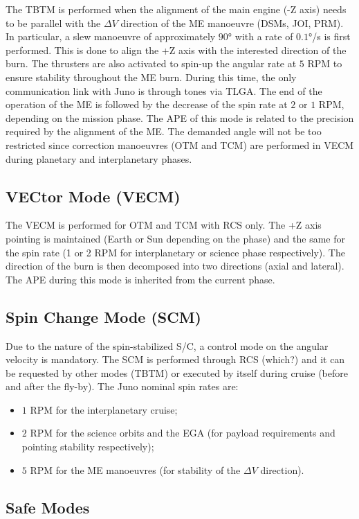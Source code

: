 The TBTM is performed when the alignment of the main engine (-Z axis) needs to be parallel with the $\Delta V$ direction of the ME manoeuvre (DSMs, JOI, PRM). In particular, a slew manoeuvre of approximately $90$° with a rate of $0.1$°/s is first performed. This is done to align the +Z axis with the interested direction of the burn. The thrusters are also activated to spin-up the angular rate at $5$ RPM to ensure stability throughout the ME burn. During this time, the only communication link with Juno is through tones via TLGA. The end of the operation of the ME is followed by the decrease of the spin rate at $2$ or $1$ RPM, depending on the mission phase. The APE of this mode is related to the precision required by the alignment of the ME. The demanded angle will not be too restricted since correction manoeuvres (OTM and TCM) are performed in VECM during planetary and interplanetary phases.

\subsection{VECtor Mode (VECM)}
\label{subsec:vec_mode}

The VECM is performed for OTM and TCM with RCS only. The +Z axis pointing is maintained (Earth or Sun depending on the phase) and the same for the spin rate (1 or 2 RPM for interplanetary or science phase respectively). The direction of the burn is then decomposed into two directions (axial and lateral). The APE during this mode is inherited from the current phase. 

\subsection{Spin Change Mode (SCM)}
\label{subsec:spin_change_mode}

Due to the nature of the spin-stabilized S/C, a control mode on the angular velocity is mandatory. The SCM is performed through RCS (which?) and it can be requested by other modes (TBTM) or executed by itself during cruise (before and after the fly-by). The Juno nominal spin rates are:
\begin{itemize}
    \item $1$ RPM for the interplanetary cruise;
    \item $2$ RPM for the science orbits and the EGA (for payload requirements and pointing stability respectively); 
    \item $5$ RPM for the ME manoeuvres (for stability of the $\Delta V$ direction). 
\end{itemize}

\subsection{Safe Modes}
\label{subsec:safe_modes}